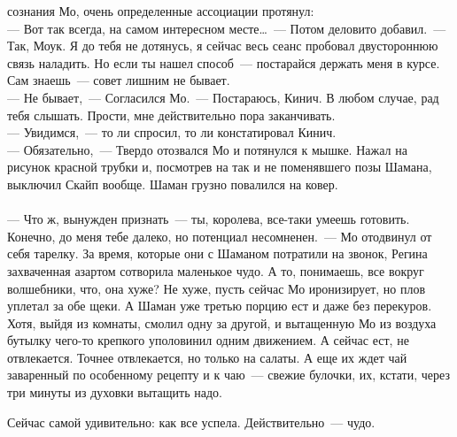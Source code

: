 сознания Мо, очень определенные ассоциации протянул:\\
--- Вот так всегда, на самом интересном месте\ldots~--- Потом деловито 
добавил.~--- Так, Моук. Я до тебя не дотянусь, я сейчас весь сеанс пробовал двустороннюю связь 
наладить. Но если ты нашел способ~--- постарайся держать меня в курсе. Сам 
знаешь~--- совет лишним не бывает.\\
--- Не бывает,~--- Согласился Мо.~--- Постараюсь, Кинич. В любом случае, рад тебя 
слышать. Прости, мне действительно пора заканчивать.\\
--- Увидимся,~--- то ли спросил, то ли констатировал Кинич.\\
--- Обязательно,~--- Твердо отозвался Мо и потянулся к мышке. Нажал на рисунок 
красной трубки и, посмотрев на так и не поменявшего позы Шамана, выключил Скайп 
вообще. Шаман грузно повалился на ковер.\\
\\

\noindent --- Что ж, вынужден признать~--- ты, королева, все-таки умеешь готовить. Конечно, 
до меня тебе далеко, но потенциал несомненен.~--- Мо отодвинул от себя тарелку. За 
время, которые они с Шаманом потратили на звонок, Регина захваченная азартом 
сотворила маленькое чудо. А то, понимаешь, все вокруг волшебники, что, она 
хуже? Не хуже, пусть сейчас Мо иронизирует, но плов уплетал за обе щеки. А Шаман уже 
третью порцию ест и даже без перекуров. Хотя, выйдя из комнаты, смолил одну за 
другой, и вытащенную Мо из воздуха бутылку чего-то крепкого уполовинил одним 
движением. А сейчас ест, не отвлекается. Точнее отвлекается, но только на 
салаты. А еще их ждет чай заваренный по особенному рецепту и к чаю~--- свежие 
булочки, их, кстати, через три минуты из духовки вытащить надо. 

Сейчас самой удивительно: как все успела. Действительно~--- чудо. 

